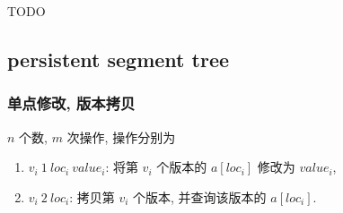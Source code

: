 \documentclass[UTF8, a4paper, titlepage, twoside]{ctexart}
\begin{document}
TODO

\subsection{ persistent segment tree }

\subsubsection*{ 单点修改, 版本拷贝 }

\(n\) 个数, \(m\) 次操作, 操作分别为

\begin{enumerate}
    \item $v_i \ 1 \ loc_i \ value_i$: 将第 $v_i$ 个版本的 $a[loc_i]$ 修改为 $value_i$,
    \item $v_i \ 2 \ loc_i$: 拷贝第 $v_i$ 个版本, 并查询该版本的 $a[loc_i]$.
\end{enumerate}
\end{document}
